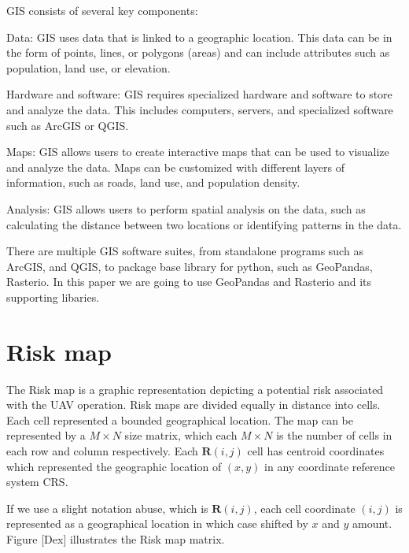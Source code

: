 \documentclass[12pt]{report}
\begin{document}
            GIS consists of several key components:
            \begin{myitemize}
                \item Data: GIS uses data that is linked to a geographic location. This data can be in the form of
                points, lines, or polygons (areas) and can include attributes such as population, land use, or
                elevation.
                \item Hardware and software: GIS requires specialized hardware and software to store and analyze the
                data. This includes computers, servers, and specialized software such as ArcGIS or QGIS.
                \item Maps: GIS allows users to create interactive maps that can be used to visualize and analyze the
                data. Maps can be customized with different layers of information, such as roads, land use, and
                population density.
                \item Analysis: GIS allows users to perform spatial analysis on the data, such as calculating the
                distance between two locations or identifying patterns in the data.
            \end{myitemize}

            There are multiple GIS software suites, from standalone programs such as ArcGIS, and QGIS, to package base
            library for python, such as GeoPandas, Rasterio. In this paper we are going to use GeoPandas and Rasterio
            and its supporting libaries.

    \section{Risk map}
        The Risk map is a graphic representation depicting a potential risk associated with the UAV operation. Risk maps
        are divided equally in distance into cells. Each cell represented a bounded geographical location. The map can
        be represented by a \(M \times N\) size matrix, which each \(M \times N\) is the number of cells in each row and
        column respectively. Each \(\mathbf{R}(i,j)\) cell has centroid coordinates which represented the geographic
        location of \((x, y)\) in any coordinate reference system \ac{CRS}.

        If we use a slight notation abuse, which is \(\mathbf{R}(i,j)\), each cell coordinate \((i, j)\) is represented
        as a geographical location in which case shifted by \(x\) and \(y\) amount. Figure [Dex] illustrates the Risk map
        matrix.
\end{document}
